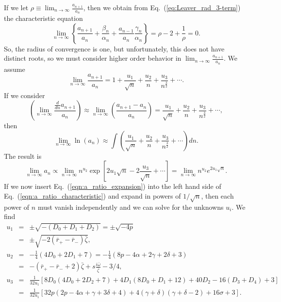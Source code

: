 \documentclass[11pt]{article}
\begin{document}
If we let $\rho\equiv\lim_{n\to\infty}\frac{a_{n+1}}{a_n}$, then we obtain 
from Eq.~(\ref{eq:Leaver_rad_3-term}) the characteristic equation
\begin{equation}\label{eqn:a_ratio_characteristic}
  \lim_{n\to\infty}\left\{\frac{a_{n+1}}{a_n}+\frac{\beta_n}{\alpha_n}+
  \frac{a_{n-1}}{a_n}\frac{\gamma_n}{\alpha_n}\right\}=\rho-2+\frac1{\rho}=0.
\end{equation}
So, the radius of convergence is one, but unfortunately, this does not
have distinct roots, so we must consider higher order behavior in
$\lim_{n\to\infty}\frac{a_{n+1}}{a_n}$.  We assume
\begin{equation}\label{eqn:a_ratio_expansion}
  \lim_{n\to\infty}\frac{a_{n+1}}{a_n} = 1 + \frac{u_1}{\sqrt{n}}
      + \frac{u_2}{n} + \frac{u_3}{n^{\frac32}} +\cdots.
\end{equation}
If we consider
\begin{equation}
  \left(\lim_{n\to\infty}\frac{ \frac{d}{dn}a_{n+1}}{a_n}\right) \approx
   \lim_{n\to\infty}\left(\frac{a_{n+1}-a_n}{a_n}\right) =
   \frac{u_1}{\sqrt{n}} + \frac{u_2}{n} + \frac{u_3}{n^{\frac32}} +\cdots,
\end{equation}
then
\begin{equation}\label{eq:residual_def}
  \lim_{n\to\infty}\ln(a_n) \approx \int\left(\frac{u_1}{\sqrt{n}} 
    + \frac{u_2}{n} + \frac{u_3}{n^{\frac32}} +\cdots\right)dn.
\end{equation}
The result is
\begin{equation}\label{eq:asymptotic_a}
  \lim_{n\to\infty}a_n \propto 
  \lim_{n\to\infty}n^{u_2}\exp\left[2u_1\sqrt{n}-2\frac{u_3}{\sqrt{n}} 
    +\cdots\right] 
  = \lim_{n\to\infty}n^{u_2} e^{2u_1\sqrt{n}}.
\end{equation}
If we now insert Eq.~(\ref{eqn:a_ratio_expansion}) into the left hand
side of Eq.~(\ref{eqn:a_ratio_characteristic}) and expand in powers of
$1/\sqrt{n}$, then each power of $n$ must vanish independently and we
can solve for the unknowns $u_i$.  We find
\begin{eqnarray}
  u_1 &=& \pm\sqrt{-(D_0+D_1+D_2)} =\pm\sqrt{-4p} \\
    &=& \pm\sqrt{-2(\bar{r}_+-\bar{r}_\minus)\bar\zeta}, \\
  u_2 &=& -\frac14(4D_0+2D_1+7) = -\frac14(8p-4\alpha+2\gamma+2\delta+3) \\
    &=& -(\bar{r}_+-\bar{r}_\minus+2)\bar\zeta 
        + s\frac{i\bar\omega}{\bar\zeta} -3/4, \\
  u_3 &=& \frac1{32u_1}\left[8D_0(4D_0+2D_2+7)+4D_1(8D_0+D_1+12)
                             +40D_2-16(D_3+D_4)+3\right] \\
      &=& \frac1{32u_1}\left[32p(2p-4\alpha+\gamma+3\delta+4) 
                +4(\gamma+\delta)(\gamma+\delta-2) +16\sigma+3\right].
\end{eqnarray}
\end{document}
